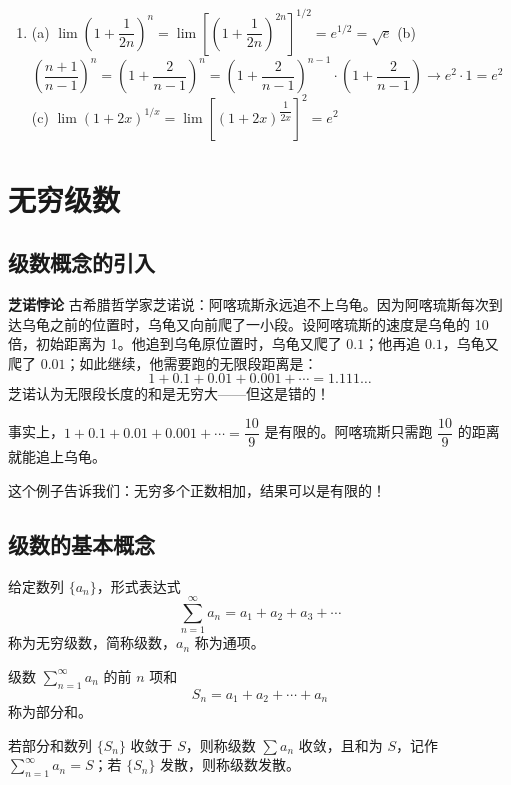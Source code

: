 \documentclass[fontset=fandol]{ctexart}
\newenvironment{custom}[1]{\par\noindent\textbf{#1}\quad}{\par\vspace{0.8em}}
\begin{document}
\begin{enumerate}
\item[10.] 
   (a) \(\lim\left(1+\dfrac{1}{2n}\right)^n = \lim\left[\left(1+\dfrac{1}{2n}\right)^{2n}\right]^{1/2} = e^{1/2} = \sqrt{e}\) \quad
   (b) \(\left(\dfrac{n+1}{n-1}\right)^n = \left(1 + \dfrac{2}{n-1}\right)^n = \left(1 + \dfrac{2}{n-1}\right)^{n-1} \cdot \left(1 + \dfrac{2}{n-1}\right) \to e^2 \cdot 1 = e^2\) \quad
   (c) \(\lim (1+2x)^{1/x} = \lim \left[(1+2x)^{\dfrac{1}{2x}}\right]^2 = e^2\)
\end{enumerate}

\clearpage
\section{无穷级数}

\subsection{级数概念的引入}

\begin{custom}{芝诺悖论}
古希腊哲学家芝诺说：阿喀琉斯永远追不上乌龟。因为阿喀琉斯每次到达乌龟之前的位置时，乌龟又向前爬了一小段。设阿喀琉斯的速度是乌龟的 10 倍，初始距离为 1。他追到乌龟原位置时，乌龟又爬了 \(0.1\)；他再追 \(0.1\)，乌龟又爬了 \(0.01\)；如此继续，他需要跑的无限段距离是：
\[
1 + 0.1 + 0.01 + 0.001 + \cdots = 1.111\ldots
\]
芝诺认为无限段长度的和是无穷大——但这是错的！

事实上，\(1 + 0.1 + 0.01 + 0.001 + \cdots = \dfrac{10}{9}\) 是有限的。阿喀琉斯只需跑 \(\dfrac{10}{9}\) 的距离就能追上乌龟。
\end{custom}

这个例子告诉我们：无穷多个正数相加，结果可以是有限的！

\subsection{级数的基本概念}

\begin{definition}[常数项级数]
给定数列 \(\{a_n\}\)，形式表达式
\[
\sum_{n=1}^{\infty} a_n = a_1 + a_2 + a_3 + \cdots
\]
称为无穷级数，简称级数，\(a_n\) 称为通项。
\end{definition}

\begin{definition}[部分和]
级数 \(\sum_{n=1}^{\infty} a_n\) 的前 \(n\) 项和
\[
S_n = a_1 + a_2 + \cdots + a_n
\]
称为部分和。
\end{definition}

\begin{definition}[级数收敛与发散]
若部分和数列 \(\{S_n\}\) 收敛于 \(S\)，则称级数 \(\sum a_n\) 收敛，且和为 \(S\)，记作 \(\sum_{n=1}^{\infty} a_n = S\)；若 \(\{S_n\}\) 发散，则称级数发散。
\end{definition}
\end{document}
